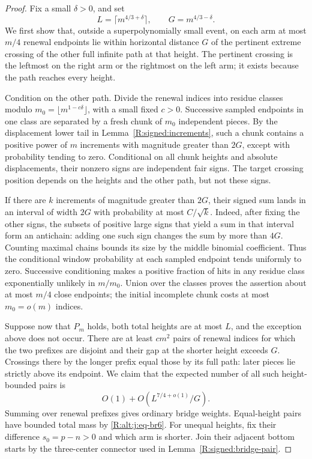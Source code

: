 \begin{proof}
Fix a small $\delta>0$, and set
\[
 L=\lceil m^{4/3+\delta}\rceil,\qquad G=m^{4/3-\delta}.
\]
We first show that, outside a superpolynomially small event, on each arm
at most $m/4$ renewal endpoints lie within horizontal distance $G$ of the
pertinent extreme crossing of the other full infinite path at that height.
The pertinent crossing is the leftmost on the right arm or the rightmost
on the left arm; it exists because the path reaches every height.

Condition on the other path. Divide the renewal indices into residue
classes modulo $m_0=\lfloor m^{1-c\delta}\rfloor$, with a small fixed
$c>0$. Successive sampled endpoints in one class are separated by a
fresh chunk of $m_0$ independent pieces. By the displacement lower tail
in Lemma~\ref{R:signed:increments}, such a chunk contains a positive
power of $m$ increments with magnitude greater than $2G$, except with
probability tending to zero. Conditional on all chunk heights and
absolute displacements, their nonzero signs are independent fair signs.
The target crossing position depends on the heights and the other path,
but not these signs.

If there are $k$ increments of magnitude greater than $2G$, their signed
sum lands in an interval of width $2G$ with probability at most
$C/\sqrt{k}$. Indeed, after fixing the other signs, the subsets of positive
large signs that yield a sum in that interval form an antichain: adding
one such sign changes the sum by more than $4G$. Counting maximal chains
bounds its size by the middle binomial coefficient. Thus the conditional
window probability at each sampled endpoint tends uniformly to zero.
Successive conditioning makes a positive fraction of hits in any residue
class exponentially unlikely in $m/m_0$. Union over the classes proves
the assertion about at most $m/4$ close endpoints; the initial incomplete
chunk costs at most $m_0=o(m)$ indices.

Suppose now that $P_m$ holds, both total heights are at most $L$, and the
exception above does not occur. There are at least $cm^2$ pairs of renewal
indices for which the two prefixes are disjoint and their gap at the
shorter height exceeds $G$. Crossings there by the longer prefix equal
those by its full path: later pieces lie strictly above its endpoint.
We claim that the expected number of all such height-bounded pairs is
\begin{equation}\label{R:signed:gap-pairs}
 O(1)+O(L^{7/4+o(1)}/G).
\end{equation}
Summing over renewal prefixes gives ordinary bridge weights. Equal-height
pairs have bounded total mass by \eqref{R:alt:j:eq-br6}. For unequal
heights, fix their difference $s_0=p-n>0$ and which arm is shorter.
Join their adjacent bottom starts by the three-center connector used in
Lemma~\ref{R:signed:bridge-pair}.


\end{proof}
